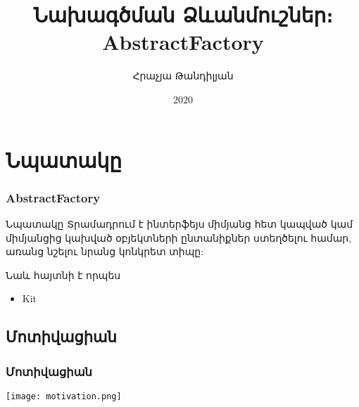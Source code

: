 \documentclass{beamer}
\begin{document}
\title[AbstractFactory]{Նախագծման Ձևանմուշներ։ AbstractFactory}
\author[Հրաչյա Թանդիլյան\copyright]{Հրաչյա Թանդիլյան}
\date{2020}

\begin{frame}
\titlepage
\end{frame}

\section{Նպատակը}
\begin{frame}\frametitle{AbstractFactory}
\begin{block}{Նպատակը}
    Տրամադրում է ինտերֆեյս միմյանց հետ կապված կամ միմյանցից կախված օբյեկտների
    ընտանիքներ ստեղծելու համար, առանց նշելու նրանց կոնկրետ տիպը:
\end{block}
\vfill
Նաև հայտնի է որպես
\begin{itemize}
    \item Kit
\end{itemize}
\end{frame}

\subsection{Մոտիվացիան}
\begin{frame}\frametitle{Մոտիվացիան}
\begin{center}
    \texttt{[image: motivation.png]}
\end{center}
\end{frame}
\end{document}
